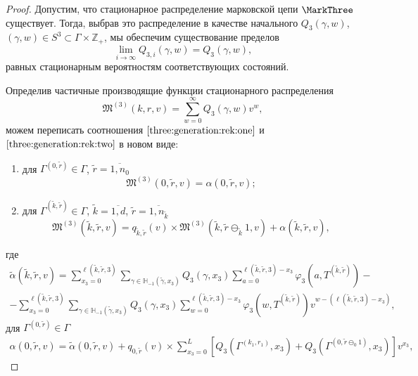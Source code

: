 \begin{proof}

Допустим,  что стационарное распределение марковской цепи $\MarkThree$ существует. Тогда, выбрав это распределение в качестве начального $Q_3(\gamma, w)$,  $(\gamma, w)\in S^{3} \subset  \Gamma\times {\mathbb Z}_+$, мы обеспечим существование пределов 
$$
\lim_{i\to \infty} Q_{3, i}(\gamma, w) = Q_3(\gamma, w), 
$$
равных стационарным вероятностям соответствующих состояний. 

Определив частичные производящие функции стационарного распределения
$$
\mathfrak{M}^{(3)}(k, r, v) = \sum_{w=0}^{\infty} Q_3(\gamma, w) v^w, 
$$
можем переписать соотношения $\eqref{three:generation:rek:one}$ и $\eqref{three:generation:rek:two}$ в новом виде:
\begin{enumerate}[label={\arabic*)}]
\item для $ \Gamma^{(0, \tilde{r})} \in \Gamma$,  $\tilde{r} = \overline{1, n_0}$ 
\begin{equation}
\mathfrak{M}^{(3)}(0, \tilde{r}, v) = \alpha(0, \tilde{r}, v);
\label{three:generation:one}
\end{equation}
\item для $\Gamma^{(\tilde{k}, \tilde{r})} \in \Gamma $,  $\tilde{k} =\overline{1, d}$,  $\tilde{r}=\overline{1, n_{\tilde{k}}}$
\begin{equation}
\mathfrak{M}^{(3)}(\tilde{k}, \tilde{r}, v) = q_{\tilde{k}, \tilde{r}} (v)\times  \mathfrak{M}^{(3)}(\tilde{k}, \tilde{r} \ominus_{\tilde{k}} 1, v) + \alpha(\tilde{k}, \tilde{r}, v),
\label{three:generation:two}
\end{equation}
\end{enumerate}
где 
\begin{multline}
\tilde{\alpha}(\tilde{k}, \tilde{r}, v) = \sum_{x_3=0}^{\ell(\tilde{k}, \tilde{r}, 3)}\sum_{\gamma \in {\mathbb H}_{-1}(\tilde{\gamma}, x_3)} Q_3(\gamma, x_3) \sum_{a=0}^{\ell(\tilde{k}, \tilde{r}, 3) - x_3} \varphi_3(a, T^{(\tilde{k}, \tilde{r})}) - \\
- \sum_{x_3=0}^{\ell(\tilde{k}, \tilde{r}, 3)}  \sum_{\gamma \in {\mathbb H}_{-1}(\tilde{\gamma}, x_3)} Q_3(\gamma, x_3) \sum_{w=0}^{\ell(\tilde{k}, \tilde{r}, 3) -x_3}
\varphi_3(w, T^{(\tilde{k}, \tilde{r})}) v^{w-(\ell(\tilde{k}, \tilde{r}, 3)-x_3)},
\end{multline}
для $ \Gamma^{(0, \tilde{r})} \in \Gamma$
\begin{multline}
\alpha(0, \tilde{r}, v) =\tilde{\alpha}(0, \tilde{r}, v) + q_{0, \tilde{r}}(v) \times \sum_{x_3=0}^{L} \left[ Q_3(\Gamma^{(k_1, r_1)}, x_3) + Q_3(\Gamma^{(0, \tilde{r}\ominus_0 1)}, x_3) \right] v^{x_3},

\end{multline}
\end{proof}
